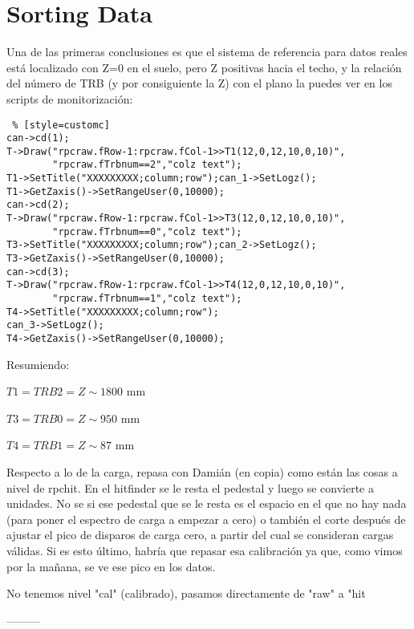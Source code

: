 \chapter{Sorting Data}

Una de las primeras conclusiones es que el sistema de referencia para datos reales está localizado con Z=0 en el suelo, pero Z positivas hacia el techo, y la relación del número de TRB (y por consiguiente la Z) con el plano la puedes ver en los scripts de monitorización:

\begin{lstlisting} % [style=customc]
can->cd(1);
T->Draw("rpcraw.fRow-1:rpcraw.fCol-1>>T1(12,0,12,10,0,10)",
        "rpcraw.fTrbnum==2","colz text");
T1->SetTitle("XXXXXXXXX;column;row");can_1->SetLogz();
T1->GetZaxis()->SetRangeUser(0,10000);
can->cd(2);
T->Draw("rpcraw.fRow-1:rpcraw.fCol-1>>T3(12,0,12,10,0,10)",
        "rpcraw.fTrbnum==0","colz text");
T3->SetTitle("XXXXXXXXX;column;row");can_2->SetLogz();
T3->GetZaxis()->SetRangeUser(0,10000);
can->cd(3);
T->Draw("rpcraw.fRow-1:rpcraw.fCol-1>>T4(12,0,12,10,0,10)",
        "rpcraw.fTrbnum==1","colz text");
T4->SetTitle("XXXXXXXXX;column;row");
can_3->SetLogz();
T4->GetZaxis()->SetRangeUser(0,10000);
\end{lstlisting}

Resumiendo:

$T1 = TRB 2 = Z \sim 1800$ mm

$T3 = TRB 0 = Z \sim  950$ mm

$T4 = TRB 1 = Z \sim   87$ mm

Respecto a lo de la carga, repasa con Damián (en copia) como están las cosas a nivel de rpchit. En el hitfinder se le resta el pedestal y luego se convierte a unidades. No se si ese pedestal que se le resta es el espacio en el que no hay nada (para poner el espectro de carga a empezar a cero) o también el corte después de ajustar el pico de disparos de carga cero, a partir del cual se consideran cargas válidas. Si es esto último, habría que repasar esa calibración ya que, como vimos por la mañana, se ve ese pico en los datos.

No tenemos nivel "cal" (calibrado), pasamos directamente de "raw" a "hit

---------


